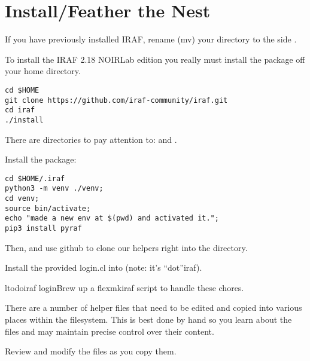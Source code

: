 
\section{Install/Feather the Nest} \label{sec:InstallFeatherNest}

If you have previously installed IRAF, rename (mv) your directory to
the side .

To install the IRAF 2.18 NOIRLab edition  
you really must install the package off your home directory.

\begingroup \fontsize{10pt}{10pt}
\selectfont
\begin{verbatim} 
cd $HOME
git clone https://github.com/iraf-community/iraf.git
cd iraf
./install
\end{verbatim}
\endgroup

There are  directories to pay attention to:
 and .

Install the  package:

\begingroup \fontsize{10pt}{10pt}
\selectfont
\begin{verbatim} 
cd $HOME/.iraf
python3 -m venv ./venv; 
cd venv;
source bin/activate;
echo "made a new env at $(pwd) and activated it.";
pip3 install pyraf
\end{verbatim}
\endgroup


Then,  and use github to clone our helpers right into
the   directory.

Install the provided login.cl into  (note: it's ``dot''iraf).

ltodo{iraf login}{Brew up a flexmkiraf script to handle these chores.}

There are a number of helper files that need to be edited and copied
into various places within the filesystem. This is best done by hand
so you learn about the files and may maintain precise control over
their content.

Review and modify the  files as you copy them.

